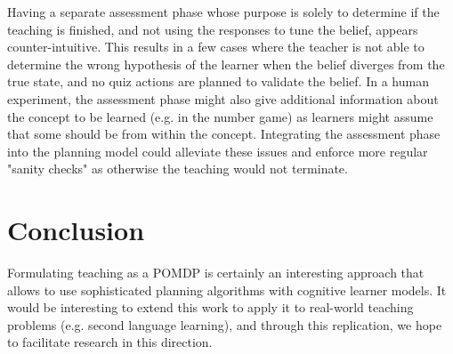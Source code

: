 

Having a separate assessment phase whose purpose is solely to determine if the teaching is finished, and not using the responses to tune the belief, appears counter-intuitive. 
This results in a few cases where the teacher is not able to determine the wrong hypothesis of the learner when the belief diverges from the true state, and no quiz actions are planned to validate the belief. 
In a human experiment, the assessment phase might also give additional information about the concept to be learned (e.g. in the number game) as learners might assume that some should be from within the concept.
Integrating the assessment phase into the planning model could alleviate these issues and enforce more regular "sanity checks" as otherwise the teaching would not terminate.






\section{Conclusion}
Formulating teaching as a POMDP is certainly an interesting approach that allows to use sophisticated planning algorithms with cognitive learner models.
It would be interesting to extend this work to apply it to real-world teaching problems (e.g. second language learning), and through this  replication, we hope to facilitate research in this direction. %

